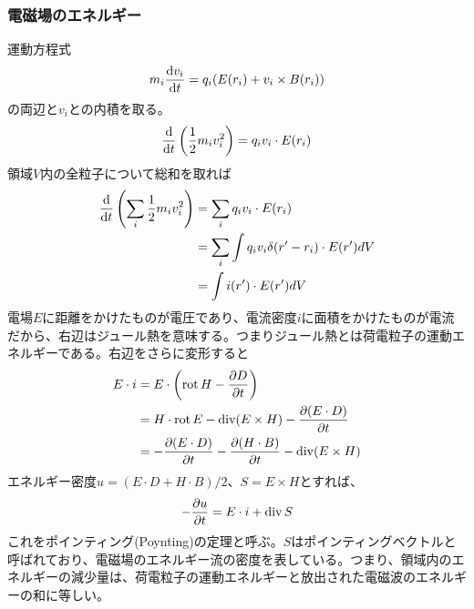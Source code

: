     \subsubsection{電磁場のエネルギー}
        運動方程式
            \[m_i\dv{v_i}{t} = q_i(E(r_i) + v_i \times B(r_i))\]
        の両辺と$v_i$との内積を取る。
            \[\dv{t}\left(\frac{1}{2}m_iv_i^2\right) = q_iv_i \cdot E(r_i)\]
        領域$V$内の全粒子について総和を取れば
        \begin{align*}
            \dv{t}\left(\sum_i \frac{1}{2}m_iv_i^2\right)
                &= \sum_i q_iv_i \cdot E(r_i)\\
                &= \sum_i \int q_iv_i\delta(r' - r_i) \cdot E(r') dV\\
                &= \int i(r') \cdot E(r') dV
        \end{align*}
        電場$E$に距離をかけたものが電圧であり、電流密度$i$に面積をかけたものが電流だから、右辺はジュール熱を意味する。つまりジュール熱とは荷電粒子の運動エネルギーである。右辺をさらに変形すると
        \begin{align*}
            E \cdot i
                &= E \cdot \left(\rot H - \pd[D]{t}\right)\\
                &= H \cdot \rot E - \div(E \times H) - \pd[(E \cdot D)]{t}\\
                &= -\pd[(E \cdot D)]{t} - \pd[(H \cdot B)]{t} - \div(E \times H)
        \end{align*}
        エネルギー密度$u = (E \cdot D + H \cdot B) / 2$、$S = E \times H$とすれば、
            \[-\pd[u]{t} = E \cdot i + \div S\]
        これをポインティング(Poynting)の定理と呼ぶ。$S$はポインティングベクトルと呼ばれており、電磁場のエネルギー流の密度を表している。つまり、領域内のエネルギーの減少量は、荷電粒子の運動エネルギーと放出された電磁波のエネルギーの和に等しい。

